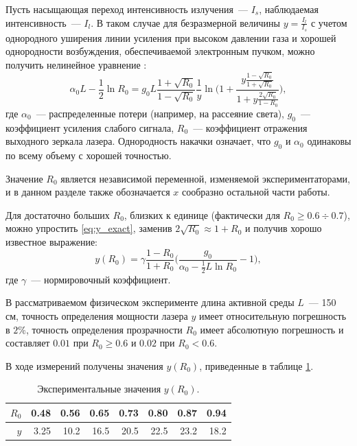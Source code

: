 \documentclass[tikz,10pt,a4paper]{article}
\begin{document}
Пусть насыщающая переход интенсивность излучения~--- $I_s$, наблюдаемая интенсивность~---
$I_l$. В таком случае для безразмерной величины $y = \frac{I_l}{I_s}$ с учетом однородного
уширения линии усиления при высоком давлении газа и хорошей однородности возбуждения,
обеспечиваемой электронным пучком, можно получить нелинейное уравнение \cite{champagne1982transient}:
\begin{equation}
  \alpha_0 L - \frac{1}{2} \ln R_0 = g_0 L \frac{1 + \sqrt{R_0}}{1 - \sqrt{R_0}} \frac{1}{y} \ln \Big( 1 + \frac{y \frac{1 - \sqrt{R_0}}{1 + \sqrt{R_0}}}{1 + y \frac{2 \sqrt{R_0}}{1 - R_0}} \Big),
  \label{eq:y_exact}
\end{equation}
где $\alpha_0$~--- распределенные потери (например, на рассеяние света),
$g_0$~--- коэффициент усиления слабого сигнала, $R_0$~--- коэффициент отражения выходного
зеркала лазера. Однородность накачки означает, что $g_0$ и $\alpha_0$ одинаковы по
всему объему с хорошей точностью.

Значение $R_0$ является независимой переменной, изменяемой экспериментаторами, и в данном
разделе также обозначается $x$ сообразно остальной части работы.

Для достаточно больших $R_0$, близких к единице (фактически для $R_0 \geq 0.6 \div 0.7$),
можно упростить \eqref{eq:y_exact}, заменив $2 \sqrt{R_0} \approx 1 + R_0$ и получив
хорошо известное выражение:
\begin{equation}
  y(R_0) = \gamma \frac{1 - R_0}{1 + R_0} \Big(\frac{g_0}{\alpha_0 - \frac{1}{2} L \ln R_0} - 1\Big),
  \label{eq:y_approx}
\end{equation}
где $\gamma$~--- нормировочный коэффициент.

В рассматриваемом физическом эксперименте длина активной среды $L$~--- 150 см,
точность определения мощности лазера $y$ имеет
относительную погрешность в $2\%$, точность определения прозрачности $R_0$ имеет
абсолютную погрешность и составляет $0.01$ при $R_0 \geq 0.6$ и $0.02$ при $R_0 < 0.6$.

В ходе измерений получены значения $y(R_0)$, приведенные в таблице \ref{tabl:measurements}.

\begin{table}[h]
  \caption{Экспериментальные значения $y(R_0)$.}
  \centering
  \begin{tabular}{| r | r | r | r | r | r | r | r |}
	\hline
	$R_0$	&	0.48	&	0.56	&	0.65	&	0.73	&	0.80	&	0.87	&	0.94	\\ \hline
	$y$		&	3.25	&	10.2	&	16.5	&	20.5	&	22.5	&	23.2	&	18.2	\\ \hline
  \end{tabular}
  \label{tabl:measurements}
\end{table}
\end{document}
